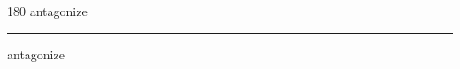 
\begin{frame}
\begin{center}
\begin{turn}{180}
{\fontsize{2.5cm}{1em}\selectfont antagonize}
\end{turn}
\vspace{1em}\par  
\hrule
\vspace{1em}\par  
{\fontsize{2.5cm}{1em}\selectfont antagonize}
\end{center}
\end{frame}
